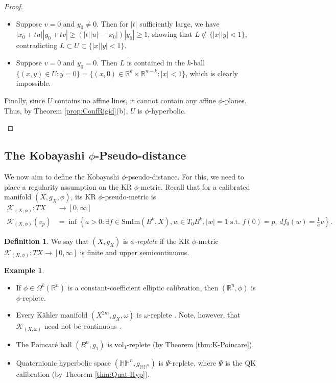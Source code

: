 \documentclass[11pt]{article}
\newcommand{\R}{\mathbb{R}}
\newcommand{\vol}{\mathrm{vol}}
\theoremstyle{definition}
\newtheorem{defn}[thm]{Definition}
\newtheorem{example}[thm]{Example}
\numberwithin{equation}{section}
\begin{document}
\begin{proof}
\begin{enumerate}[(a)]
\begin{itemize}
\item Suppose $v = 0$ and $y_0 \neq 0$.  Then for $|t|$ sufficiently large, we have $|x_0 + tu| |y_0 + tv| \geq  (|t| |u| - |x_0|)|y_0| \geq 1$, showing that $L \not\subset \{|x| |y| < 1\}$, contradicting $L \subset U \subset \{|x| |y| < 1\}$.
\item Suppose $v = 0$ and $y_0 = 0$.  Then $L$ is contained in the $k$-ball $\{(x,y) \in U \colon y = 0\} = \{(x,0) \in \R^k \times \R^{n-k} \colon |x| < 1\}$, which is clearly impossible.
\end{itemize}
Finally, since $U$ contains no affine lines, it cannot contain any affine $\phi$-planes.  Thus, by Theorem \ref{prop:ConfRigid}(b), $U$ is $\phi$-hyperbolic.
\end{enumerate}
\end{proof}


\subsection{The Kobayashi $\phi$-Pseudo-distance} \label{sub:KobDist}

\indent \indent We now aim to define the Kobayashi $\phi$-pseudo-distance.  For this, we need to place a regularity assumption on the KR $\phi$-metric.  Recall that for a calibrated manifold $(X, g_X, \phi)$, its KR $\phi$-pseudo-metric is
\begin{align*}
\mathcal{K}_{(X, \phi)} \colon TX & \to [0,  \infty] \\
\mathcal{K}_{(X, \phi)}(v_p) & = \inf\!\left\{ a > 0 \colon \exists f \in \mathrm{SmIm}(B^k, X), w \in T_0B^k, |w| = 1 \text{ s.t. } f(0) = p,\, df_0(w) = \frac{1}{a}v \right\}\!.
\end{align*}


\begin{defn} We say that $(X,g_X)$ is \emph{$\phi$-replete} if the KR $\phi$-metric $\mathcal{K}_{(X,\phi)} \colon TX \to [0,\infty]$ is finite and upper semicontinuous.  %
\end{defn}

\begin{example} ${}$
\begin{itemize}
\item If $\phi \in \Omega^k(\R^n)$ is a constant-coefficient elliptic calibration, then $(\R^n, \phi)$ is $\phi$-replete.
\item Every K\"{a}hler manifold $(X^{2m}, g_X, \omega)$ is $\omega$-replete \cite{royden2006remarks}.  Note, however, that $\mathcal{K}_{(X,\omega)}$ need not be continuous \cite[Example 3.5.37]{kobayashi2013hyperbolic}.
\item The Poincar\'{e} ball $(B^n, g_1)$ is $\vol_1$-replete (by Theorem \ref{thm:K-Poincare}).
\item Quaternionic hyperbolic space $(\mathbb{HH}^n, g_{\mathbb{HH}^n})$ is $\Psi$-replete, where $\Psi$ is the QK calibration  (by Theorem \ref{thm:Quat-Hyp}).
\end{itemize}
\end{example}
\end{document}
